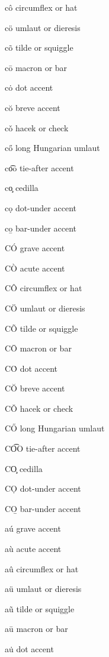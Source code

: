 c\^o circumflex or hat	%

c\"o umlaut or dieresis	%

c\~o tilde or squiggle	%

c\=o macron or bar	%

c\.o dot accent		%

c\u o breve accent	%

c\v o hacek or check	%

c\H o long Hungarian umlaut	%

c\t oo tie-after accent	%

c\c o cedilla		%

c\d o dot-under accent	%

c\b o bar-under accent	%


C\'O grave accent	%

C\`O acute accent	%

C\^O circumflex or hat	%

C\"O umlaut or dieresis	%

C\~O tilde or squiggle	%

C\=O macron or bar	%

C\.O dot accent		%

C\u O breve accent	%

C\v O hacek or check	%

C\H O long Hungarian umlaut	%

C\t OO tie-after accent	%

C\c O cedilla		%

C\d O dot-under accent	%

C\b O bar-under accent	%



a\'u grave accent	%

a\`u acute accent	%

a\^u circumflex or hat	%

a\"u umlaut or dieresis	%

a\~u tilde or squiggle	%

a\=u macron or bar	%

a\.u dot accent		%

